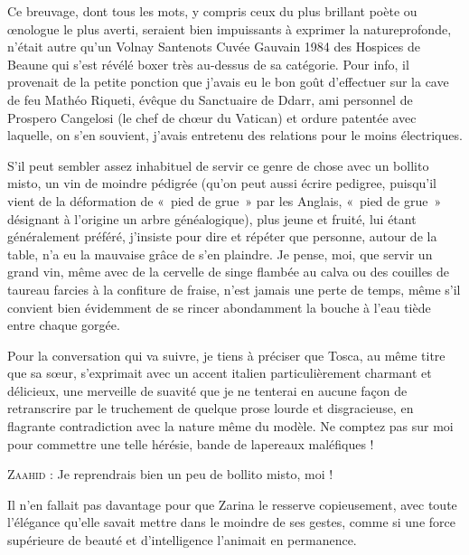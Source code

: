 %
Ce breuvage, dont tous les mots, y compris ceux du plus brillant poète ou œnologue le plus averti, seraient bien impuissants à exprimer la natureprofonde, n’était autre qu’un Volnay Santenots Cuvée Gauvain 1984 des Hospices de Beaune qui s’est révélé boxer très au-dessus de sa catégorie. Pour info, il provenait de la petite ponction que j’avais eu le bon goût d’effectuer sur la cave de feu Mathéo Riqueti, évêque du Sanctuaire de Ddarr, ami personnel de Prospero Cangelosi (le chef de chœur du Vatican) et ordure patentée avec laquelle, on s’en souvient, j’avais entretenu des relations pour le moins électriques.

S’il peut sembler assez inhabituel de servir ce genre de chose avec un bollito misto, un vin de moindre pédigrée (qu’on peut aussi écrire pedigree, puisqu’il vient de la déformation de «~pied de grue~» par les Anglais, «~pied de grue~» désignant à l’origine un arbre généalogique), plus jeune et fruité, lui étant généralement préféré, j’insiste pour dire et répéter que personne, autour de la table, n’a eu la mauvaise grâce de s’en plaindre. Je pense, moi, que servir un grand vin, même avec de la cervelle de singe flambée au calva ou des couilles de taureau farcies à la confiture de fraise, n’est jamais une perte de temps, même s’il convient bien évidemment de se rincer abondamment la bouche à l’eau tiède entre chaque gorgée.

Pour la conversation qui va suivre, je tiens à préciser que Tosca, au même titre que sa sœur, s’exprimait avec un accent italien particulièrement charmant et délicieux, une merveille de suavité que je ne tenterai en aucune façon de retranscrire par le truchement de quelque prose lourde et disgracieuse, en flagrante contradiction avec la nature même du modèle. Ne comptez pas sur moi pour commettre une telle hérésie, bande de lapereaux maléfiques !

\begin{dialogue}

\textsc{Zaahid} : Je reprendrais bien un peu de bollito misto, moi !

\end{dialogue}

Il n’en fallait pas davantage pour que Zarina le resserve copieusement, avec toute l’élégance qu’elle savait mettre dans le moindre de ses gestes, comme si une force supérieure de beauté et d’intelligence l’animait en permanence.

